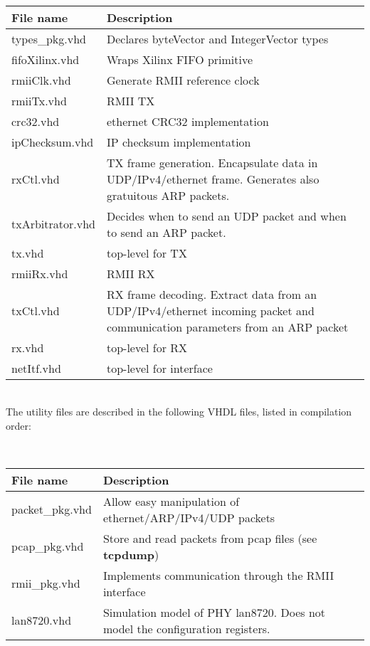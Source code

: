 \documentclass[a4paper]{hitec}
\begin{document}
\ \\
\begin{tabularx}{\linewidth}{|lX|}
	\hline
	File name & Description \\
	\hline
	types\_pkg.vhd    & Declares byteVector and IntegerVector types \\
	fifoXilinx.vhd    & Wraps Xilinx FIFO primitive \\
	rmiiClk.vhd       & Generate RMII reference clock \\
	rmiiTx.vhd        & RMII TX \\
	crc32.vhd         & ethernet CRC32 implementation \\
	ipChecksum.vhd    & IP checksum implementation \\
	rxCtl.vhd         & TX frame generation. Encapsulate data in UDP/IPv4/ethernet frame. Generates also gratuitous ARP packets. \\
	txArbitrator.vhd  & Decides when to send an UDP packet and when to send an ARP packet. \\
	tx.vhd            & top-level for TX \\
	rmiiRx.vhd        & RMII RX \\
	txCtl.vhd         & RX frame decoding. Extract data from an UDP/IPv4/ethernet incoming packet and communication parameters from an ARP packet\\
	rx.vhd            & top-level for RX \\
	netItf.vhd        & top-level for interface \\
	\hline
\end{tabularx}

\ \\
The utility files are described in the following VHDL files, listed in compilation order:

\ \\
\begin{tabularx}{\linewidth}{|lX|}
	\hline
	File name & Description \\
	\hline
	packet\_pkg.vhd  & Allow easy manipulation of ethernet/ARP/IPv4/UDP packets \\
	pcap\_pkg.vhd    & Store and read packets from pcap files (see \textbf{tcpdump}) \\
	rmii\_pkg.vhd    & Implements communication through the RMII interface \\
	lan8720.vhd      & Simulation model of PHY lan8720. Does not model the configuration registers. \\
	\hline
\end{tabularx}
\end{document}
